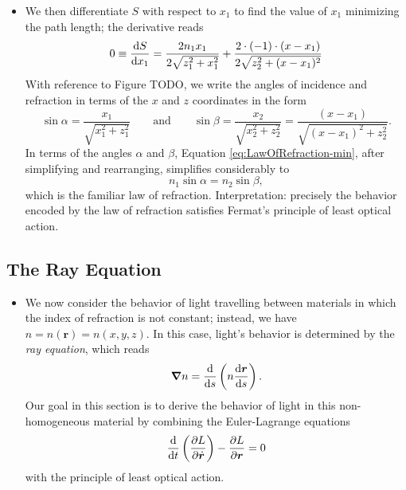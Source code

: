 \documentclass[11pt, a4paper]{article}
\renewcommand{\vec}[1]{\bm{#1}} %
\renewcommand{\r}{\vec{r}}  %
\begin{document}
\begin{itemize}
    \item We then differentiate $ S $ with respect to $ x_{1} $ to find the value of $ x_{1} $ minimizing the path length; the derivative reads
    \begin{equation}
        0 \equiv \dv{S}{x_{1}} = \frac{2n_{1} x_{1}}{2 \sqrt{z_{1}^{2} + x_{1}^{2}}} + \frac{2 \cdot (-1) \cdot (x - x_{1})}{2 \sqrt{z_{2}^{2} + (x-x_{1})^{2}}} \label{eq:LawOfRefraction-min}
    \end{equation}
    With reference to Figure TODO, we write the angles of incidence and refraction in terms of the $ x $ and $ z $ coordinates in the form
    \begin{equation*}
        \sin \alpha = \frac{x_{1}}{\sqrt{x_{1}^{2} + z_{1}^{2}}} \qquad \text{and} \qquad \sin \beta = \frac{x_{2}}{\sqrt{x_{2}^{2} + z_{2}^{2}}} = \frac{(x - x_{1})}{\sqrt{(x - x_{1})^{2} + z_{2}^{2}}}.
    \end{equation*}
    In terms of the angles $ \alpha $ and $ \beta $, Equation \ref{eq:LawOfRefraction-min}, after simplifying and rearranging, simplifies considerably to
    \begin{equation*}
        n_{1} \sin \alpha = n_{2} \sin \beta,
    \end{equation*}
    which is the familiar law of refraction. Interpretation: precisely the behavior encoded by the law of refraction satisfies Fermat's principle of least optical action.
    
\end{itemize}
    
\subsection{The Ray Equation}
\begin{itemize}
    \item We now consider the behavior of light travelling between materials in which the index of refraction is not constant; instead, we have $ n = n(\r) = n(x, y, z) $. In this case, light's behavior is determined by the \textit{ray equation}, which reads
    \begin{equation*}
        \grad n = \dv{s} \left( n \dv{\r}{s} \right).
    \end{equation*}
    Our goal in this section is to derive the behavior of light in this non-homogeneous material by combining the Euler-Lagrange equations
    \begin{equation}
        \dv{t}\left( \pdv{L}{\dot{\vec{r}}} \right) - \pdv{L}{\r} = 0 \label{eq:lagrange-euler}
    \end{equation}
    with the principle of least optical action.
    
\end{itemize}
\end{document}
